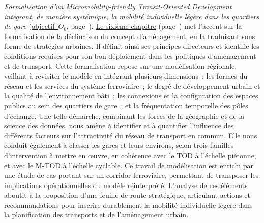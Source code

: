\textsl{Formalisation d'un Micromobility-friendly Transit-Oriented Development intégrant, de manière systémique, la mobilité individuelle légère dans les quartiers de gare} (\hyperref[objectif-6]{objectif~\(O_6\)}, page~\pageref{objectif-6}). \hyperref[chap6:titre]{Le sixième chapitre} (page~\pageref{chap6:titre}) met l'accent sur la formalisation de la déclinaison du concept d'aménagement, en la traduisant sous forme de stratégies urbaines. Il définit ainsi ses principes directeurs et identifie les conditions requises pour son bon déploiement dans les politiques d'aménagement et de transport. Cette formalisation repose sur une modélisation régionale, veillant à revisiter le modèle  en intégrant plusieurs dimensions~: les formes du réseau et les services du système ferroviaire~; le degré de développement urbain et la qualité de l'environnement bâti~; les connexions et la configuration des espaces publics au sein des quartiers de gare~; et la fréquentation temporelle des pôles d'échange. Une telle démarche, combinant les forces de la géographie et de la science des données, nous amène à identifier et à quantifier l'influence des différents facteurs sur l'attractivité du réseau de transport en commun. Elle nous conduit également à classer les gares et leurs environs, selon trois familles d'intervention à mettre en œuvre, en cohérence avec le \acrshort{TOD} à l'échelle piétonne, et avec le \acrshort{M-TOD} à l'échelle cyclable. Ce travail de modélisation est enrichi par une étude de cas portant sur un corridor ferroviaire, permettant de transposer les implications opérationnelles du modèle réinterprété. L’analyse de ces éléments aboutit à la proposition d'une feuille de route stratégique, articulant actions et recommandations pour inscrire durablement la mobilité individuelle légère dans la planification des transports et de l’aménagement urbain.%